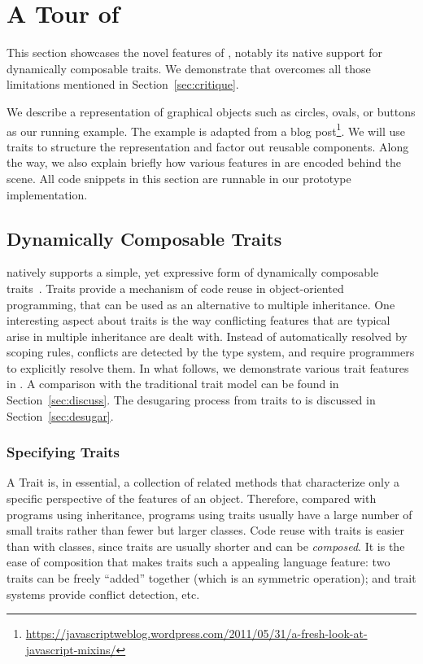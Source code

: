 
\section{A Tour of \name}
\label{sec:traits}

This section showcases the novel features of \name, notably its native support
for dynamically composable traits. We demonstrate that \name overcomes all those
limitations mentioned in Section~\ref{sec:critique}.

We describe a representation of graphical objects such as circles, ovals, or
buttons as our running example. The example is adapted from a blog
post\footnote{\url{https://javascriptweblog.wordpress.com/2011/05/31/a-fresh-look-at-javascript-mixins/}}.
We will use traits to structure the representation and factor out reusable
components. Along the way, we also explain briefly how various features in \name
are encoded behind the scene. All code snippets in this section are runnable in
our prototype implementation.


\subsection{Dynamically Composable Traits}

\name natively supports a simple, yet expressive form of dynamically composable
traits~\cite{scharli2003traits}. Traits provide a mechanism of code reuse in
object-oriented programming, that can be used as an alternative to multiple
inheritance. One interesting aspect about traits is the way conflicting features
that are typical arise in multiple inheritance are dealt with. Instead of
automatically resolved by scoping rules, conflicts are detected by the type
system, and require programmers to explicitly resolve them. In what follows, we
demonstrate various trait features in \name. A comparison with the traditional
trait model can be found in Section~\ref{sec:discuss}. The desugaring process
from traits to \bname is discussed in Section~\ref{sec:desugar}.

\subsubsection{Specifying Traits}

A Trait is, in essential, a collection of related methods that characterize only
a specific perspective of the features of an object. Therefore, compared with
programs using inheritance, programs using traits usually have a large number of
small traits rather than fewer but larger classes. Code reuse with traits is
easier than with classes, since traits are usually shorter and can be
\textit{composed}. It is the ease of composition that makes traits such a
appealing language feature: two traits can be freely ``added'' together (which
is an symmetric operation); and trait systems provide conflict detection, etc.

